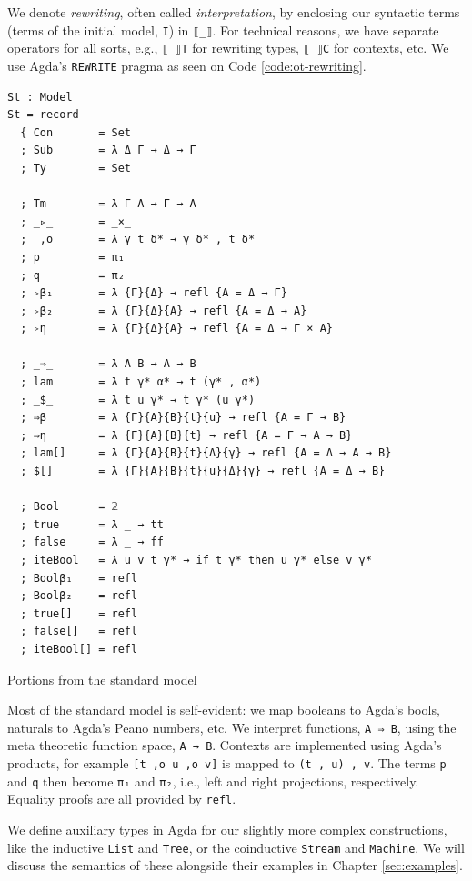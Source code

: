 We denote \textit{rewriting}, often called \textit{interpretation}, by enclosing our syntactic terms (terms of the initial model, \verb$I$) in \verb$⟦_⟧$. For technical reasons, we have separate operators for all sorts, e.g., \verb$⟦_⟧T$ for rewriting types, \verb$⟦_⟧C$ for contexts, etc. We use Agda's \verb$REWRITE$ pragma as seen on Code \ref{code:ot-rewriting}.

\begin{listing}[H]
\begin{verbatim}
St : Model
St = record
  { Con       = Set
  ; Sub       = λ Δ Γ → Δ → Γ
  ; Ty        = Set

  ; Tm        = λ Γ A → Γ → A
  ; _▹_       = _×_
  ; _,o_      = λ γ t δ* → γ δ* , t δ*
  ; p         = π₁
  ; q         = π₂
  ; ▹β₁       = λ {Γ}{Δ} → refl {A = Δ → Γ}
  ; ▹β₂       = λ {Γ}{Δ}{A} → refl {A = Δ → A}
  ; ▹η        = λ {Γ}{Δ}{A} → refl {A = Δ → Γ × A}

  ; _⇒_       = λ A B → A → B
  ; lam       = λ t γ* α* → t (γ* , α*)
  ; _$_       = λ t u γ* → t γ* (u γ*)
  ; ⇒β        = λ {Γ}{A}{B}{t}{u} → refl {A = Γ → B}
  ; ⇒η        = λ {Γ}{A}{B}{t} → refl {A = Γ → A → B}
  ; lam[]     = λ {Γ}{A}{B}{t}{Δ}{γ} → refl {A = Δ → A → B}
  ; $[]       = λ {Γ}{A}{B}{t}{u}{Δ}{γ} → refl {A = Δ → B}

  ; Bool      = 𝟚
  ; true      = λ _ → tt
  ; false     = λ _ → ff
  ; iteBool   = λ u v t γ* → if t γ* then u γ* else v γ*
  ; Boolβ₁    = refl
  ; Boolβ₂    = refl
  ; true[]    = refl
  ; false[]   = refl
  ; iteBool[] = refl
\end{verbatim}
\caption{Portions from the standard model}
\label{code:ot-st-model}
\end{listing}

Most of the standard model is self-evident: we map booleans to Agda's bools, naturals to Agda's Peano numbers, etc. We interpret functions, \verb$A ⇒ B$, using the meta theoretic function space, \verb$A → B$. Contexts are implemented using Agda's products, for example \verb$[t ,o u ,o v]$ is mapped to \verb$(t , u) , v$. The terms \verb$p$ and \verb$q$ then become \verb$π₁$ and \verb$π₂$, i.e., left and right projections, respectively. Equality proofs are all provided by \verb$refl$.

We define auxiliary types in Agda for our slightly more complex constructions, like the inductive \verb$List$ and \verb$Tree$, or the coinductive \verb$Stream$ and \verb$Machine$. We will discuss the semantics of these alongside their examples in Chapter \ref{sec:examples}.

